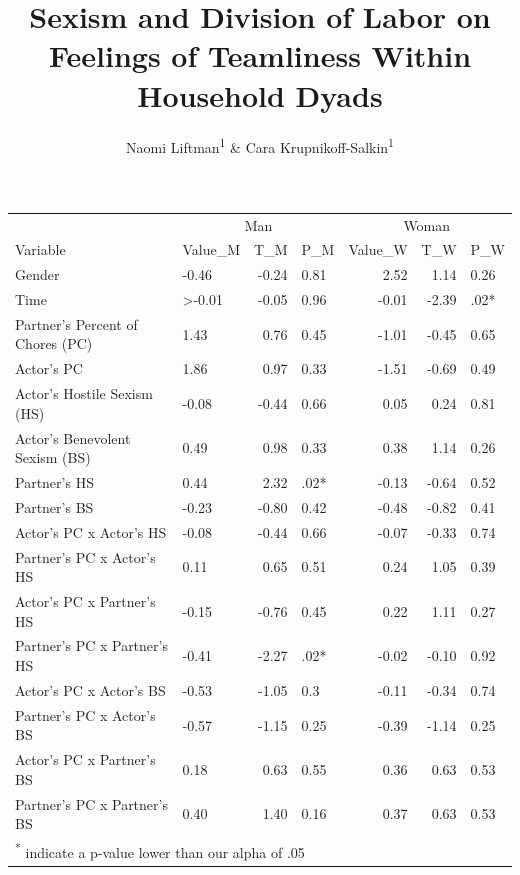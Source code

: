 \documentclass[
  man]{apa6}
\title{Sexism and Division of Labor on Feelings of Teamliness Within Household Dyads}
\author{Naomi Liftman\textsuperscript{1} \& Cara Krupnikoff-Salkin\textsuperscript{1}}
\date{}
\affiliation{\vspace{0.5cm}\textsuperscript{1} Smith College}
\begin{document}
\maketitle

\begin{table}
\centering
\begin{tabular}{l|l|r|l|r|r|l}
\hline
\multicolumn{1}{c|}{ } & \multicolumn{3}{c|}{Man} & \multicolumn{3}{c}{Woman} \\
\cline{2-4} \cline{5-7}
Variable & Value\_M & T\_M & P\_M & Value\_W & T\_W & P\_W\\
\hline
Gender & -0.46 & -0.24 & 0.81 & 2.52 & 1.14 & 0.26\\
\hline
Time & >-0.01 & -0.05 & 0.96 & -0.01 & -2.39 & .02*\\
\hline
Partner's Percent of Chores (PC) & 1.43 & 0.76 & 0.45 & -1.01 & -0.45 & 0.65\\
\hline
Actor's PC & 1.86 & 0.97 & 0.33 & -1.51 & -0.69 & 0.49\\
\hline
Actor's Hostile Sexism (HS) & -0.08 & -0.44 & 0.66 & 0.05 & 0.24 & 0.81\\
\hline
Actor's Benevolent Sexism (BS) & 0.49 & 0.98 & 0.33 & 0.38 & 1.14 & 0.26\\
\hline
Partner's HS & 0.44 & 2.32 & .02* & -0.13 & -0.64 & 0.52\\
\hline
Partner's BS & -0.23 & -0.80 & 0.42 & -0.48 & -0.82 & 0.41\\
\hline
Actor's PC x Actor's HS & -0.08 & -0.44 & 0.66 & -0.07 & -0.33 & 0.74\\
\hline
Partner's PC x Actor's HS & 0.11 & 0.65 & 0.51 & 0.24 & 1.05 & 0.39\\
\hline
Actor's PC x Partner's HS & -0.15 & -0.76 & 0.45 & 0.22 & 1.11 & 0.27\\
\hline
Partner's PC x Partner's HS & -0.41 & -2.27 & .02* & -0.02 & -0.10 & 0.92\\
\hline
Actor's PC x Actor's BS & -0.53 & -1.05 & 0.3 & -0.11 & -0.34 & 0.74\\
\hline
Partner's PC x Actor's BS & -0.57 & -1.15 & 0.25 & -0.39 & -1.14 & 0.25\\
\hline
Actor's PC x Partner's BS & 0.18 & 0.63 & 0.55 & 0.36 & 0.63 & 0.53\\
\hline
Partner's PC x Partner's BS & 0.40 & 1.40 & 0.16 & 0.37 & 0.63 & 0.53\\
\hline
\multicolumn{7}{l}{\textsuperscript{*} indicate a p-value lower than our alpha of .05}\\
\end{tabular}
\end{table}
\end{document}
